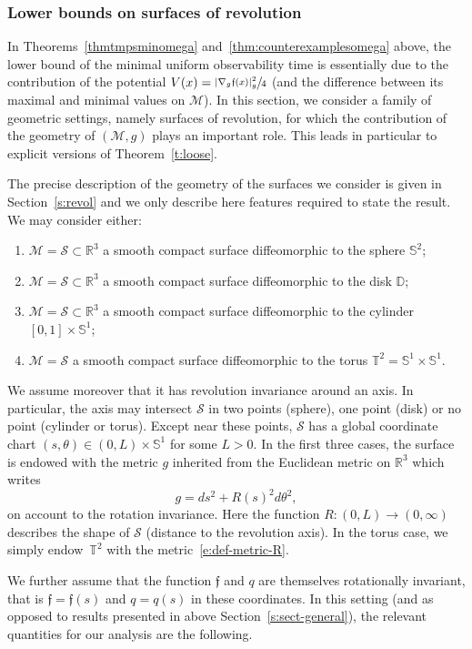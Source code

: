 \documentclass[JEP,XML,SOM,Unicode]{cedram}
\theoremstyle{definition}
\newcommand{\M}{\ensuremath{\mathcal M}}
\newcommand{\calS}{\ensuremath{\mathcal S}}
\newcommand{\mb}[1]{\ensuremath{\mathbb{#1}}}
\newcommand{\ID}{\ensuremath{\mathbb D}}
\newcommand{\R}{{\mb{R}}}
\newcommand{\bS}{\ensuremath{\mathbb S}}
\newcommand{\T}{\ensuremath{\mathbb T}}
\newcommand{\f}{\ensuremath{\mathfrak{f}}}
\begin{document}
\subsubsection{Lower bounds on surfaces of revolution}
\label{s:revol-intro}
In Theorems~\ref{thmtmpsminomega} and~\ref{thm:counterexamplesomega} above, the lower bound of the minimal uniform observability time is essentially due to the contribution of the potential $V(x) = \sfrac{|\nabla_g \f(x)|_g^2}{4}$ (and the difference between its maximal and minimal values on $\M$).
In this section, we consider a family of geometric settings, namely surfaces of revolution, for which the contribution of the geometry of $(\M,g)$ plays an important role.
This leads in particular to explicit versions of Theorem~\ref{t:loose}.

The precise description of the geometry of the surfaces we consider is given in Section~\ref{s:revol} and we only describe here features required to state the result.
We may consider either:
\begin{enumerate}
\item $\M =\calS \subset \R^3$ a smooth compact surface diffeomorphic to the sphere $\bS^2$;
\item $\M =\calS \subset \R^3$ a smooth compact surface diffeomorphic to the disk $\ID$;
\item $\M =\calS \subset \R^3$ a smooth compact surface diffeomorphic to the cylinder $[0,1]\times \bS^1$;
\item $\M =\calS$ a smooth compact surface diffeomorphic to the torus $\T^2 = \bS^1\times \bS^1$.
\end{enumerate}
We assume moreover that it has revolution invariance around an axis. In particular, the axis may intersect $\calS$ in two points (sphere), one point (disk) or no point (cylinder or torus). Except near these points, $\calS$ has a global coordinate chart $(s,\theta)\in(0,L)\times \bS^1$ for some $L>0$.
In the first three cases, the surface is endowed with the metric $g$ inherited from the Euclidean metric on $\R^3$ which writes
\begin{equation}
\label{e:def-metric-R}
g = ds^2 +R(s)^2 d\theta^2,
\end{equation}
on account to the rotation invariance.
Here the function $R:(0,L)\to (0,\infty)$ describes the shape of $\calS$ (distance to the revolution axis).
In the torus case, we simply endow~$\T^2$ with the metric~\eqref{e:def-metric-R}.

We further assume that the function $\f$ and $q$ are themselves rotationally invariant, that is $\f=\f(s)$ and $q=q(s)$ in these coordinates.
In this setting (and as opposed to results presented in above Section~\ref{s:sect-general}), the relevant quantities for our analysis are the following.
\end{document}
